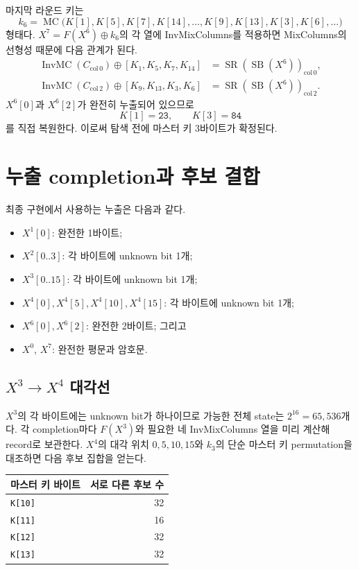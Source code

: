 \documentclass[10pt,a4paper]{article}
\begin{document}
마지막 라운드 키는
\[
k_6=\operatorname{MC}\bigl(
 K[1],K[5],K[7],K[14],\ldots,
 K[9],K[13],K[3],K[6],\ldots\bigr)
\]
형태다. $X^7=F(X^6)\oplus k_6$의 각 열에 InvMixColumns를 적용하면
MixColumns의 선형성 때문에 다음 관계가 된다.
\[
\begin{aligned}
\operatorname{InvMC}(C_{\mathrm{col}\,0})
  \oplus [K_1,K_5,K_7,K_{14}]
  &=\operatorname{SR}(\operatorname{SB}(X^6))_{\mathrm{col}\,0},\\
\operatorname{InvMC}(C_{\mathrm{col}\,2})
  \oplus [K_9,K_{13},K_3,K_6]
  &=\operatorname{SR}(\operatorname{SB}(X^6))_{\mathrm{col}\,2}.
\end{aligned}
\]
$X^6[0]$과 $X^6[2]$가 완전히 누출되어 있으므로
\[
 K[1]=\texttt{23},\qquad K[3]=\texttt{84}
\]
를 직접 복원한다. 이로써 탐색 전에 마스터 키 3바이트가 확정된다.

\section{누출 completion과 후보 결합}

최종 구현에서 사용하는 누출은 다음과 같다.

\begin{itemize}
  \item $X^1[0]$: 완전한 1바이트;
  \item $X^2[0..3]$: 각 바이트에 unknown bit 1개;
  \item $X^3[0..15]$: 각 바이트에 unknown bit 1개;
  \item $X^4[0],X^4[5],X^4[10],X^4[15]$: 각 바이트에 unknown bit 1개;
  \item $X^6[0],X^6[2]$: 완전한 2바이트; 그리고
  \item $X^0$, $X^7$: 완전한 평문과 암호문.
\end{itemize}

\subsection{\texorpdfstring{$X^3\rightarrow X^4$}{X3 to X4} 대각선}

$X^3$의 각 바이트에는 unknown bit가 하나이므로 가능한 전체 state는
$2^{16}=65{,}536$개다. 각 completion마다 $F(X^3)$와 필요한 네
InvMixColumns 열을 미리 계산해 record로 보관한다. $X^4$의 대각 위치
$0,5,10,15$와 $k_3$의 단순 마스터 키 permutation을 대조하면 다음
후보 집합을 얻는다.

\begin{center}
\begin{tabular}{lr}
\toprule
마스터 키 바이트 & 서로 다른 후보 수 \\
\midrule
\texttt{K[10]} & 32 \\
\texttt{K[11]} & 16 \\
\texttt{K[12]} & 32 \\
\texttt{K[13]} & 32 \\
\bottomrule
\end{tabular}
\end{center}
\end{document}
